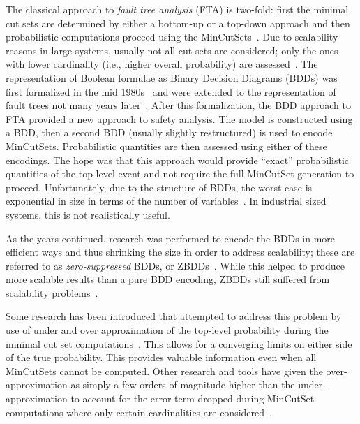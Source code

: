 The classical approach to \textit{fault tree analysis} (FTA) is two-fold: first the minimal cut sets are determined by either a bottom-up or a top-down approach and then probabilistic computations proceed using the MinCutSets~\cite{vesely1981fault,henley1996probabilistic,rausand2003system}. Due to scalability reasons in large systems, usually not all cut sets are considered; only the ones with lower cardinality (i.e., higher overall probability) are assessed~\cite{vesely1981fault,Bozzano:2010:DSA:1951720}. The representation of Boolean formulae as Binary Decision Diagrams (BDDs) was first formalized in the mid 1980s~\cite{bryant1986graph} and were extended to the representation of fault trees not many years later~\cite{rauzy1993new}. After this formalization, the BDD approach to FTA provided a new approach to safety analysis. The model is constructed using a BDD, then a second BDD (usually slightly restructured) is used to encode MinCutSets\cite{rauzy2008binary}. Probabilistic quantities are then assessed using either of these encodings. The hope was that this approach would provide ``exact'' probabilistic quantities of the top level event and not require the full MinCutSet generation to proceed. Unfortunately, due to the structure of BDDs, the worst case is exponential in size in terms of the number of variables~\cite{bryant1986graph,rauzy1993new,rauzy2008binary}. In industrial sized systems, this is not realistically useful. 

As the years continued, research was performed to encode the BDDs in more efficient ways and thus shrinking the size in order to address scalability; these are referred to as \textit{zero-suppressed} BDDs, or ZBDDs~\cite{minato2001zero}. While this helped to produce more scalable results than a pure BDD encoding, ZBDDs still suffered from scalability problems~\cite{matuzas2015dynamic, jung2008fast}. 

Some research has been introduced that attempted to address this problem by use of under and over approximation of the top-level probability during the minimal cut set computations~\cite{CAV2015:BoCiGrMa}. This allows for a converging limits on either side of the true probability. This provides valuable information even when all MinCutSets cannot be computed. Other research and tools have given the over-approximation as simply a few orders of magnitude higher than the under-approximation to account for the error term dropped during MinCutSet computations where only certain cardinalities are considered~\cite{symbAltaRica, bozzano2003improving, CHEN201391,Bozzano:2010:DSA:1951720}. 


